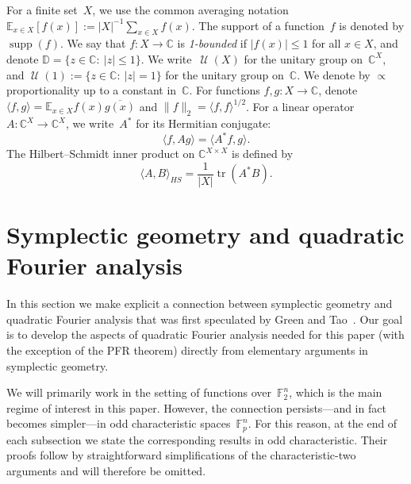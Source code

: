 \documentclass[11pt]{amsart}
\newcommand{\E}{\mathbb{E}}
\newcommand{\C}{\mathbb{C}} %
\newcommand{\D}{\mathbb{D}} %
\newcommand{\F}{\mathbb{F}} %
\DeclareMathOperator{\supp}{supp}
\DeclareMathOperator{\U}{\mathcal{U}}
\DeclareMathOperator{\tr}{tr}
\theoremstyle{plain}
\theoremstyle{definition}
\theoremstyle{remark}
\begin{document}
For a finite set~$X$, we use the common averaging notation $\E_{x\in X} [f(x)] := |X|^{-1} \sum_{x\in X} f(x)$. The support of a function~$f$ is denoted by $\supp(f)$.
We say that $f: X \to \C$ is \emph{1-bounded} if $|f(x)|\leq 1$ for all $x\in X$, and denote $\D = \{z\in\C:\: |z|\leq 1\}$. 
We write~$\U(X)$ for the unitary group on~$\C^X$, and $\U(1) := \{z\in \C:\: |z|=1\}$ for the unitary group on~$\C$.
We denote by $\propto$ proportionality up to a constant in~$\C$.
For functions $f, g: X \to \C$, denote $\langle f, g\rangle = \E_{x\in X} f(x) \overline{g(x)}$ and $\|f\|_2 = \langle f, f\rangle^{1/2}$.
For a linear operator $A: \C^X \to \C^X$, we write~$A^*$ for its Hermitian conjugate:
$$\langle f, Ag\rangle = \langle A^*f, g\rangle.$$
The Hilbert--Schmidt inner product on $\C^{X\times X}$ is defined by
\begin{equation*}
    \langle A, B\rangle_{HS} = \frac{1}{|X|} \tr(A^*B).
\end{equation*}


%
\section{Symplectic geometry and quadratic Fourier analysis}
\label{sec:symplectic}

In this section we make explicit a connection between symplectic geometry and quadratic Fourier analysis that was first speculated by Green and Tao~\cite{GreenTao2008}.
Our goal is to develop the aspects of quadratic Fourier analysis needed for this paper (with the exception of the PFR theorem) directly from elementary arguments in symplectic geometry. 

We will primarily work in the setting of functions over~$\F_2^n$, which is the main regime of interest in this paper. 
However, the connection persists---and in fact becomes simpler---in odd characteristic spaces~$\F_p^n$. 
For this reason, at the end of each subsection we state the corresponding results in odd characteristic.
Their proofs follow by straightforward simplifications of the characteristic-two arguments and will therefore be omitted.
\end{document}
